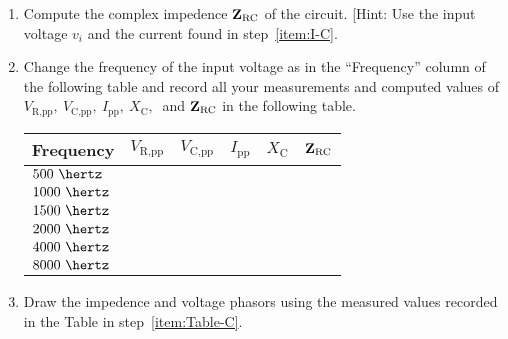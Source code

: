 \begin{enumerate}
  
\item Compute the complex impedence ${\bf Z}_{\text{RC}}$ of the circuit. [Hint: Use the input voltage $v_i$ and the current found in step~\ref{item:I-C}.

\item Change the frequency of the input voltage as in the ``Frequency'' column of the following table and record all your measurements and computed values of $V_{\text{R,pp}},~V_{\text{C,pp}},~I_{\text{pp}},~X_{\text{C}},~$ and ${\bf Z}_{\text{RC}}$  in the following table. \label{item:Table-C}


    \begin{center}
    \begin{tabular}{|l|c|c|c|c|c|}
      \toprule
      Frequency & $V_{\text{R,pp}}$ & $V_{\text{C,pp}}$ & $I_{\text{pp}}$ &  $X_{\text{C}}$ & ${\bf Z}_{\text{RC}}$\\
      \toprule
      $500~\hertz$ & &&&&\\
      \hline
      $1000~\hertz$ & &&&&\\
      \hline
      $1500~\hertz$ & &&&&\\
      \hline
      $2000~\hertz$ & &&&&\\
      \hline
      $4000~\hertz$ & &&&&\\
      \hline
      $8000~\hertz$ & &&&&\\
      \bottomrule
    \end{tabular}    
  \end{center}

  
   
\item Draw the impedence and voltage phasors using the measured values recorded in the Table in step~\ref{item:Table-C}. 


%
   
\end{enumerate}

